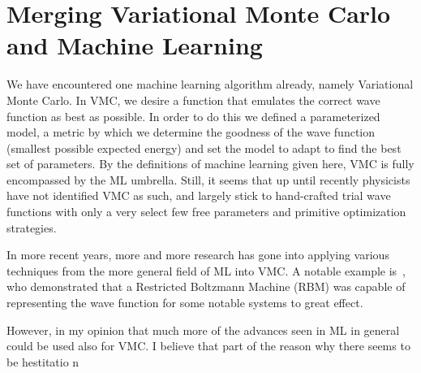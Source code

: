 \documentclass[Thesis.tex]{subfiles}
\begin{document}
\chapter{Merging Variational Monte Carlo and Machine Learning}


We have encountered one machine learning algorithm already, namely Variational
Monte Carlo. In VMC, we desire a function that emulates the correct wave
function as best as possible. In order to do this we defined a parameterized
model, a metric by which we determine the goodness of the wave function
(smallest possible expected energy) and set the model to adapt to find the best
set of parameters. By the definitions of machine learning given here, VMC is
fully encompassed by the ML umbrella. Still, it seems that up until recently
physicists have not identified VMC as such, and largely stick to hand-crafted
trial wave functions with only a very select few free parameters and primitive
optimization strategies.

In more recent years, more and more research has gone into applying various
techniques from the more general field of ML into VMC. A notable example
is~\textcite{Carleo602}, who demonstrated that a Restricted Boltzmann Machine
(RBM) was capable of representing the wave function for some notable systems to
great effect.


However, in my opinion that much more of the advances seen in ML in
general could be used also for VMC. I believe that part of the reason why there
seems to be hestitatio n
\end{document}
